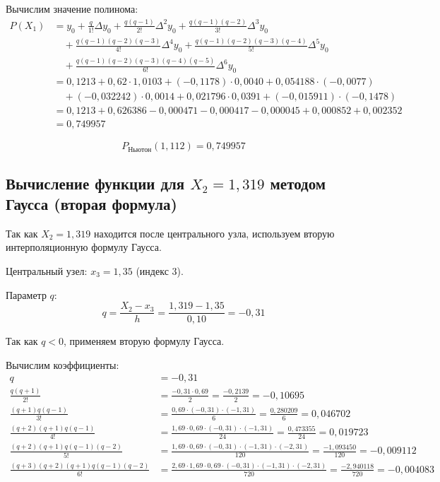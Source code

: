 Вычислим значение полинома:
\begin{align*}
P(X_1) &= y_0 + \frac{q}{1!}\Delta y_0 + \frac{q(q-1)}{2!}\Delta^2 y_0 + \frac{q(q-1)(q-2)}{3!}\Delta^3 y_0 \\
&\quad + \frac{q(q-1)(q-2)(q-3)}{4!}\Delta^4 y_0 + \frac{q(q-1)(q-2)(q-3)(q-4)}{5!}\Delta^5 y_0 \\
&\quad + \frac{q(q-1)(q-2)(q-3)(q-4)(q-5)}{6!}\Delta^6 y_0 \\
&= 0{,}1213 + 0{,}62 \cdot 1{,}0103 + (-0{,}1178) \cdot 0{,}0040 + 0{,}054188 \cdot (-0{,}0077) \\
&\quad + (-0{,}032242) \cdot 0{,}0014 + 0{,}021796 \cdot 0{,}0391 + (-0{,}015911) \cdot (-0{,}1478) \\
&= 0{,}1213 + 0{,}626386 - 0{,}000471 - 0{,}000417 - 0{,}000045 + 0{,}000852 + 0{,}002352 \\
&= 0{,}749957
\end{align*}

\[
\boxed{P_{\text{Ньютон}}(1{,}112) = 0{,}749957}
\]

\subsection{Вычисление функции для $X_2 = 1{,}319$ методом Гаусса (вторая формула)}

Так как $X_2 = 1{,}319$ находится после центрального узла, используем вторую интерполяционную формулу Гаусса.

Центральный узел: $x_3 = 1{,}35$ (индекс 3).

Параметр $q$:
\[
q = \frac{X_2 - x_3}{h} = \frac{1{,}319 - 1{,}35}{0{,}10} = -0{,}31
\]

Так как $q < 0$, применяем вторую формулу Гаусса.

Вычислим коэффициенты:
\begin{align*}
q &= -0{,}31 \\
\frac{q(q+1)}{2!} &= \frac{-0{,}31 \cdot 0{,}69}{2} = \frac{-0{,}2139}{2} = -0{,}10695 \\
\frac{(q+1)q(q-1)}{3!} &= \frac{0{,}69 \cdot (-0{,}31) \cdot (-1{,}31)}{6} = \frac{0{,}280209}{6} = 0{,}046702 \\
\frac{(q+2)(q+1)q(q-1)}{4!} &= \frac{1{,}69 \cdot 0{,}69 \cdot (-0{,}31) \cdot (-1{,}31)}{24} = \frac{0{,}473355}{24} = 0{,}019723 \\
\frac{(q+2)(q+1)q(q-1)(q-2)}{5!} &= \frac{1{,}69 \cdot 0{,}69 \cdot (-0{,}31) \cdot (-1{,}31) \cdot (-2{,}31)}{120} = \frac{-1{,}093450}{120} = -0{,}009112 \\
\frac{(q+3)(q+2)(q+1)q(q-1)(q-2)}{6!} &= \frac{2{,}69 \cdot 1{,}69 \cdot 0{,}69 \cdot (-0{,}31) \cdot (-1{,}31) \cdot (-2{,}31)}{720} = \frac{-2{,}940118}{720} = -0{,}004083
\end{align*}

